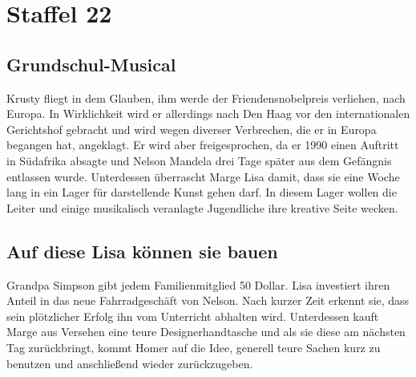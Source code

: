
\section{Staffel 22}

\subsection{Grundschul-Musical}\label{MABF21}
Krusty fliegt in dem Glauben, ihm werde der Friendensnobelpreis verliehen, nach Europa. In Wirklichkeit wird er allerdings nach Den Haag vor den internationalen Gerichtshof gebracht und wird wegen diverser Verbrechen, die er in Europa begangen hat, angeklagt. Er wird aber freigesprochen, da er 1990 einen Auftritt in Südafrika absagte und Nelson Mandela drei Tage später aus dem Gefängnis entlassen wurde. Unterdessen überrascht Marge Lisa damit, dass sie eine Woche lang in ein Lager für darstellende Kunst gehen darf. In diesem Lager wollen die Leiter und einige musikalisch veranlagte Jugendliche ihre kreative Seite wecken.


\subsection{Auf diese Lisa können sie bauen}\label{MABF17}
Grandpa Simpson gibt jedem Familienmitglied 50 Dollar. Lisa investiert ihren Anteil in das neue Fahrradgeschäft von Nelson. Nach kurzer Zeit erkennt sie, dass sein plötzlicher Erfolg ihn vom Unterricht abhalten wird. Unterdessen kauft Marge aus Versehen eine teure Designerhandtasche und als sie diese am nächsten Tag zurückbringt, kommt Homer auf die Idee, generell teure Sachen kurz zu benutzen und anschließend wieder zurückzugeben.

